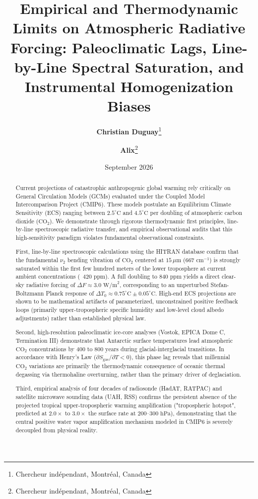 \documentclass[10pt,twocolumn]{article}
\title{Empirical and Thermodynamic Limits on Atmospheric Radiative Forcing: Paleoclimatic Lags, Line-by-Line Spectral Saturation, and Instrumental Homogenization Biases}
\author{
  \textbf{Christian Duguay}\thanks{Chercheur ind\'ependant, Montr\'eal, Canada} 
  \and 
  \textbf{Alix}\thanks{Chercheur ind\'ependant, Montr\'eal, Canada}
}
\date{September 2026}
\begin{document}
\maketitle

\begin{abstract}
Current projections of catastrophic anthropogenic global warming rely critically on General Circulation Models (GCMs) evaluated under the Coupled Model Intercomparison Project (CMIP6). These models postulate an Equilibrium Climate Sensitivity (ECS) ranging between $2.5^\circ\text{C}$ and $4.5^\circ\text{C}$ per doubling of atmospheric carbon dioxide ($\text{CO}_2$). We demonstrate through rigorous thermodynamic first principles, line-by-line spectroscopic radiative transfer, and empirical observational audits that this high-sensitivity paradigm violates fundamental observational constraints.

First, line-by-line spectroscopic calculations using the HITRAN database confirm that the fundamental $\nu_2$ bending vibration of $\text{CO}_2$ centered at $15\,\mu\text{m}$ ($667\text{ cm}^{-1}$) is strongly saturated within the first few hundred meters of the lower troposphere at current ambient concentrations (~$420\text{ ppm}$). A full doubling to $840\text{ ppm}$ yields a direct clear-sky radiative forcing of $\Delta F \approx 3.0\text{ W/m}^2$, corresponding to an unperturbed Stefan-Boltzmann Planck response of $\Delta T_0 \approx 0.75^\circ\text{C} \pm 0.05^\circ\text{C}$. High-end ECS projections are shown to be mathematical artifacts of parameterized, unconstrained positive feedback loops (primarily upper-tropospheric specific humidity and low-level cloud albedo adjustments) rather than established physical law.

Second, high-resolution paleoclimatic ice-core analyses (Vostok, EPICA Dome C, Termination III) demonstrate that Antarctic surface temperatures lead atmospheric $\text{CO}_2$ concentrations by $400\text{ to }800\text{ years}$ during glacial-interglacial transitions. In accordance with Henry's Law ($\partial S_{\text{gas}}/\partial T < 0$), this phase lag reveals that millennial $\text{CO}_2$ variations are primarily the thermodynamic consequence of oceanic thermal degassing via thermohaline overturning, rather than the primary driver of deglaciation.

Third, empirical analysis of four decades of radiosonde (HadAT, RATPAC) and satellite microwave sounding data (UAH, RSS) confirms the persistent absence of the projected tropical upper-tropospheric warming amplification ("tropospheric hotspot", predicted at $2.0\times\text{ to }3.0\times$ the surface rate at $200\text{--}300\text{ hPa}$), demonstrating that the central positive water vapor amplification mechanism modeled in CMIP6 is severely decoupled from physical reality.


\end{abstract}
\end{document}
